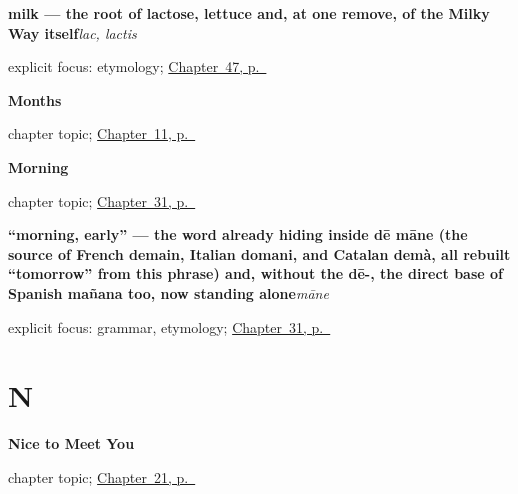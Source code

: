 \noindent\begin{minipage}[t]{\linewidth}
\raggedright
\textbf{milk — the root of lactose, lettuce and, at one remove, of the Milky Way itself}\enspace\emph{lac, lactis}\par
\footnotesize explicit focus: etymology; \hyperref[ch:la-mensa]{Chapter~47, p.~\pageref*{ch:la-mensa}}
\end{minipage}\par\smallskip

\noindent\begin{minipage}[t]{\linewidth}
\raggedright
\textbf{Months}\par
\footnotesize chapter topic; \hyperref[ch:la-months]{Chapter~11, p.~\pageref*{ch:la-months}}
\end{minipage}\par\smallskip

\noindent\begin{minipage}[t]{\linewidth}
\raggedright
\textbf{Morning}\par
\footnotesize chapter topic; \hyperref[ch:la-morning]{Chapter~31, p.~\pageref*{ch:la-morning}}
\end{minipage}\par\smallskip

\noindent\begin{minipage}[t]{\linewidth}
\raggedright
\textbf{\textquotedblleft{}morning, early\textquotedblright{} — the word already hiding inside dē māne (the source of French demain, Italian domani, and Catalan demà, all rebuilt \textquotedblleft{}tomorrow\textquotedblright{} from this phrase) and, without the dē-, the direct base of Spanish mañana too, now standing alone}\enspace\emph{māne}\par
\footnotesize explicit focus: grammar, etymology; \hyperref[ch:la-morning]{Chapter~31, p.~\pageref*{ch:la-morning}}
\end{minipage}\par\smallskip

\section*{N}

\noindent\begin{minipage}[t]{\linewidth}
\raggedright
\textbf{Nice to Meet You}\par
\footnotesize chapter topic; \hyperref[ch:la-nice-to-meet-you]{Chapter~21, p.~\pageref*{ch:la-nice-to-meet-you}}
\end{minipage}\par\smallskip

